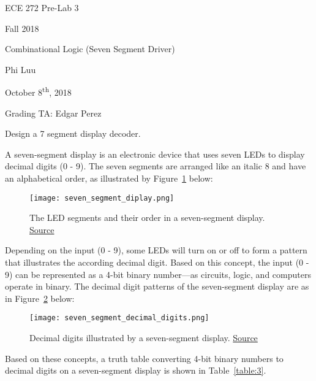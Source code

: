 \documentclass[12pt]{article}
\begin{document}
\begin{titlepage}
  \begin{center} \LARGE
    \vspace*{1.5in}

    ECE 272 Pre-Lab 3

    Fall 2018

    \vfill

    Combinational Logic (Seven Segment Driver)

    Phi Luu

    \vfill

    October 8\textsuperscript{th}, 2018

    Grading TA: Edgar Perez

    \vspace{1.5in}
  \end{center}
\end{titlepage}

{\Large Design a 7 segment display decoder.}

\rule{0em}{1.5em}

A seven-segment display is an electronic device that uses seven LEDs to display decimal digits (0 - 9). The seven segments are arranged like an italic 8 and have an alphabetical order, as illustrated by Figure~\ref{figure:1} below:

\begin{figure}[h]
  \centering
  \texttt{[image: seven\_segment\_diplay.png]}
  \caption{The LED segments and their order in a seven-segment display. \href{https://commons.wikimedia.org/wiki/Seven_segment_display}{Source}}
  \label{figure:1}
\end{figure}

Depending on the input (0 - 9), some LEDs will turn on or off to form a pattern that illustrates the according decimal digit. Based on this concept, the input (0 - 9) can be represented as a 4-bit binary number---as circuits, logic, and computers operate in binary. The decimal digit patterns of the seven-segment display are as in Figure~\ref{figure:2} below:

\begin{figure}[h]
  \centering
  \texttt{[image: seven\_segment\_decimal\_digits.png]}
  \caption{Decimal digits illustrated by a seven-segment display. \href{https://commons.wikimedia.org/wiki/Seven_segment_display}{Source}}
  \label{figure:2}
\end{figure}

Based on these concepts, a truth table converting 4-bit binary numbers to decimal digits on a seven-segment display is shown in Table~\ref{table:3}.
\end{document}
